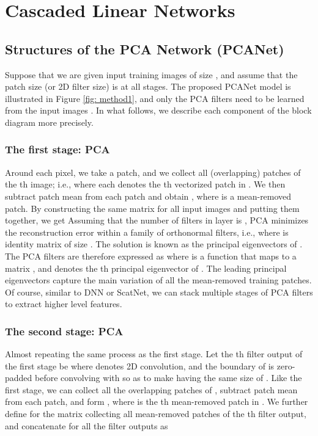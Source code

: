 \documentclass[10pt,journal,compsoc]{IEEEtran}
\begin{document}
\section{Cascaded Linear Networks}\label{sec: PCANet}

\begin{figure*}[htbp]
\centering
{}
\caption{The detailed block diagram of the proposed (two-stage) PCANet.} \label{fig: method1}\vspace{-0.2cm}
\vspace{0cm}
\end{figure*}

\subsection{Structures of the PCA Network (PCANet)}\label{sec: PCANet_main}
Suppose that we are given  input training images  of size , and assume that the patch size (or 2D filter size) is  at all stages. The proposed PCANet model is illustrated in Figure \ref{fig: method1}, and only the PCA filters need to be learned from the input images . In what follows, we describe each component of the block diagram more precisely.

\subsubsection{\bf The first stage: PCA} \label{sec: The first stage}
Around each pixel, we take a  patch, and we collect all (overlapping) patches of the th image; i.e.,  where each  denotes the th vectorized patch in . We then subtract patch mean from each patch and obtain , where  is a mean-removed patch. By constructing the same matrix for all input images and putting them together, we get
Assuming that the number of filters in layer  is , PCA minimizes the reconstruction error within a family of orthonormal filters, i.e.,
where  is identity matrix of size . The solution is known as the  principal eigenvectors of . The PCA filters are therefore expressed as
where  is a function that maps  to a matrix , and  denotes the th principal eigenvector of . The leading principal eigenvectors capture the main variation of all the mean-removed training patches. Of course, similar to DNN or ScatNet, we can stack multiple stages of PCA filters to extract higher level features.

\subsubsection{\bf The second stage: PCA}
Almost repeating the same process as the first stage. Let the th filter output of the first stage be
where  denotes 2D convolution, and the boundary of  is zero-padded before convolving with  so as to make  having the same size of . Like the first stage, we can collect all the overlapping patches of , subtract patch mean from each patch, and form , where  is the th mean-removed patch in . We further define  for the matrix collecting all mean-removed patches of the th filter output, and concatenate  for all the filter outputs as
\end{document}
